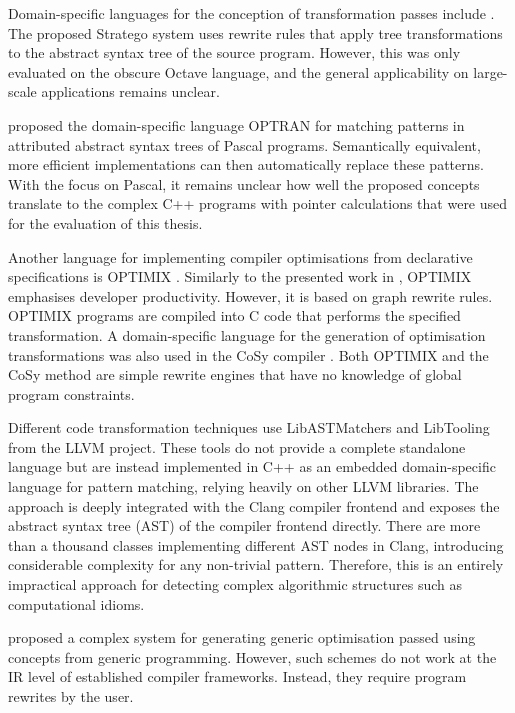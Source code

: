     Domain-specific languages for the conception of transformation passes
    include \citet{Olmos:2005:CSD:2136624.2136643}.
    The proposed Stratego system uses rewrite rules that apply tree
    transformations to the abstract syntax tree of the source program.
    However, this was only evaluated on the obscure Octave language, and the
    general applicability on large-scale applications remains unclear.

    \citet{Lipps1989} proposed the domain-specific language OPTRAN for matching
    patterns in attributed abstract syntax trees of Pascal programs.
    Semantically equivalent, more efficient implementations can then
    automatically replace these patterns.
    With the focus on Pascal, it remains unclear how well the proposed concepts
    translate to the complex C++ programs with pointer calculations that were
    used for the evaluation of this thesis.

    Another language for implementing compiler optimisations from
    declarative specifications is OPTIMIX \citep{Assmann1996,Assmann98optimix}.
    Similarly to the presented work in , OPTIMIX emphasises
    developer productivity.
    However, it is based on graph rewrite rules.
    OPTIMIX programs are compiled into C code that performs the specified
    transformation.
    A domain-specific language for the generation of optimisation
    transformations was also used in the CoSy compiler \citep{Alt1994}.
    Both OPTIMIX and the CoSy method are simple rewrite engines that have no
    knowledge of global program constraints.

    Different code transformation techniques use LibASTMatchers
    and LibTooling \citep{be0fa11ddb194bde86a9dab8589b779c} from the
    LLVM project.
    These tools do not provide a complete standalone language but are instead
    implemented in C++ as an embedded domain-specific language for pattern
    matching, relying heavily on other LLVM libraries.
    The approach is deeply integrated with the Clang compiler frontend and
    exposes the abstract syntax tree (AST) of the compiler frontend directly.
    There are more than a thousand classes implementing different AST nodes in
    Clang, introducing considerable complexity for any non-trivial pattern.
    Therefore, this is an entirely impractical approach for detecting complex
    algorithmic structures such as computational idioms.

    \citet{Willcock:2009:RGP:1621607.1621611} proposed a complex system for
    generating generic optimisation passed using concepts from generic
    programming.
    However, such schemes do not work at the IR level of established
    compiler frameworks.
    Instead, they require program rewrites by the user.

